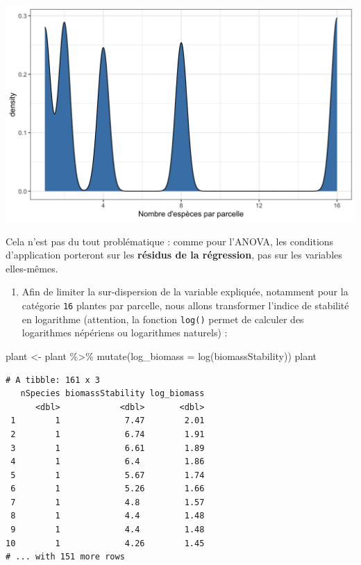 \documentclass[
  a4paper,
]{article}
\newenvironment{Shaded}{\begin{snugshade}}{\end{snugshade}}
\newcommand{\AttributeTok}[1]{\textcolor[rgb]{0.00,0.34,0.68}{#1}}
\newcommand{\FunctionTok}[1]{\textcolor[rgb]{0.39,0.29,0.61}{#1}}
\newcommand{\NormalTok}[1]{\textcolor[rgb]{0.12,0.11,0.11}{#1}}
\newcommand{\OtherTok}[1]{\textcolor[rgb]{0.00,0.43,0.16}{#1}}
\newcommand{\SpecialCharTok}[1]{\textcolor[rgb]{0.24,0.68,0.91}{#1}}
\providecommand{\tightlist}{%
  \setlength{\itemsep}{0pt}\setlength{\parskip}{0pt}}
\begin{document}
\begin{center}\includegraphics[width=0.9\linewidth]{figure/unnamed-chunk-115-1} \end{center}

Cela n'est pas du tout problématique : comme pour l'ANOVA, les conditions d'application porteront sur les \textbf{résidus de la régression}, pas sur les variables elles-mêmes.

\begin{enumerate}
\def\labelenumi{\arabic{enumi}.}
\setcounter{enumi}{1}
\tightlist
\item
  Afin de limiter la sur-dispersion de la variable expliquée, notamment pour la catégorie \texttt{16} plantes par parcelle, nous allons transformer l'indice de stabilité en logarithme (attention, la fonction \texttt{log()} permet de calculer des logarithmes népériens ou logarithmes naturels) :
\end{enumerate}

\begin{Shaded}
\begin{Highlighting}[]
\NormalTok{plant }\OtherTok{\textless{}{-}}\NormalTok{ plant }\SpecialCharTok{\%\textgreater{}\%} 
  \FunctionTok{mutate}\NormalTok{(}\AttributeTok{log\_biomass =} \FunctionTok{log}\NormalTok{(biomassStability))}
\NormalTok{plant}
\end{Highlighting}
\end{Shaded}

\begin{verbatim}
# A tibble: 161 x 3
   nSpecies biomassStability log_biomass
      <dbl>            <dbl>       <dbl>
 1        1             7.47        2.01
 2        1             6.74        1.91
 3        1             6.61        1.89
 4        1             6.4         1.86
 5        1             5.67        1.74
 6        1             5.26        1.66
 7        1             4.8         1.57
 8        1             4.4         1.48
 9        1             4.4         1.48
10        1             4.26        1.45
# ... with 151 more rows
\end{verbatim}
\end{document}
